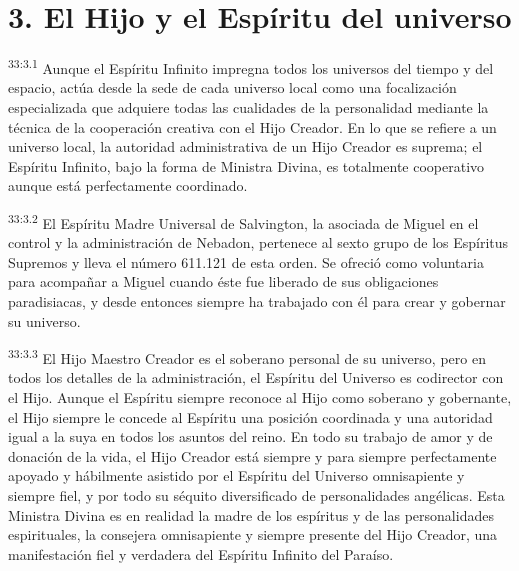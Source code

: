 \section*{3. El Hijo y el Espíritu del universo}
\par
\textsuperscript{33:3.1} Aunque el Espíritu Infinito impregna todos los universos del tiempo y del espacio, actúa desde la sede de cada universo local como una focalización especializada que adquiere todas las cualidades de la personalidad mediante la técnica de la cooperación creativa con el Hijo Creador. En lo que se refiere a un universo local, la autoridad administrativa de un Hijo Creador es suprema; el Espíritu Infinito, bajo la forma de Ministra Divina, es totalmente cooperativo aunque está perfectamente coordinado.

\par
\textsuperscript{33:3.2} El Espíritu Madre Universal de Salvington, la asociada de Miguel en el control y la administración de Nebadon, pertenece al sexto grupo de los Espíritus Supremos y lleva el número 611.121 de esta orden. Se ofreció como voluntaria para acompañar a Miguel cuando éste fue liberado de sus obligaciones paradisiacas, y desde entonces siempre ha trabajado con él para crear y gobernar su universo.

\par
\textsuperscript{33:3.3} El Hijo Maestro Creador es el soberano personal de su universo, pero en todos los detalles de la administración, el Espíritu del Universo es codirector con el Hijo. Aunque el Espíritu siempre reconoce al Hijo como soberano y gobernante, el Hijo siempre le concede al Espíritu una posición coordinada y una autoridad igual a la suya en todos los asuntos del reino. En todo su trabajo de amor y de donación de la vida, el Hijo Creador está siempre y para siempre perfectamente apoyado y hábilmente asistido por el Espíritu del Universo omnisapiente y siempre fiel, y por todo su séquito diversificado de personalidades angélicas. Esta Ministra Divina es en realidad la madre de los espíritus y de las personalidades espirituales, la consejera omnisapiente y siempre presente del Hijo Creador, una manifestación fiel y verdadera del Espíritu Infinito del Paraíso.

